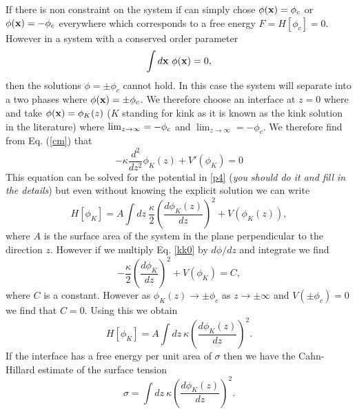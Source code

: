 If there is non constraint on the system if can simply chose $\phi({\bf x}) =\phi_c$ or $\phi({\bf x}) =-\phi_c$ everywhere which corresponds to a  free energy $F=H[\phi_c]=0$. However in a system with a conserved order parameter
\begin{equation}
    \int d{\bf x} \  \phi({\bf x})=0, 
\end{equation}
then the solutions $\phi=\pm \phi_c$ cannot hold. In this case the system will separate into a two phases where $\phi({\bf x})= \pm \phi_c$. We therefore choose an interface at $z=0$ where 
and take $\phi({\bf x}) = \phi_K(z)$ ($K$ standing for kink as it is known as the kink solution in the literature) where $\lim_{z\to\-\infty}=-\phi_c$ and  $\lim_{z\to\infty}=-\phi_c$. 
We therefore find from Eq. (\ref{cm}) that
\begin{equation}
    -\kappa \frac{d^2 }{dz^2}\phi_K(z)  + V'(\phi_K) = 0 \label{kk0}
\end{equation}
This equation can be solved for the potential in \eqref{p4} ({\em you should do it and fill in the details}) but even without knowing the explicit solution we can write
\begin{equation}
    H[\phi_K]=  A\int dz \ \frac{\kappa}{2}\left(\frac{d\phi_K(z)}{dz}\right)^2 + V(\phi_K(z)),\label{kk1}
\end{equation}
where $A$ is the surface area of the system in the plane perpendicular to the direction $z$. 
However if we multiply Eq. \eqref{kk0} by $d\phi/dz$ and integrate we find
\begin{equation}
    -\frac{\kappa}{2} (\frac{d\phi_K}{dz})^2 + V(\phi_K) = C,
\end{equation}
where $C$ is a constant. However as $\phi_K(z)\to \pm \phi_c$ as $z\to \pm \infty$ and $V(\pm\phi_c) =0$ we find that $C=0$. Using this we obtain 
\begin{equation}
    H[\phi_K]=  A\int dz\  {\kappa}\left(\frac{d\phi_K(z)}{dz}\right)^2 .
\end{equation}
If the interface has a free energy per unit area of $\sigma$ then we have the Cahn-Hillard estimate of the surface tension 
\begin{equation}
    \sigma=  \int dz\  {\kappa}\left(\frac{d\phi_K(z)}{dz}\right)^2 .\label{CHST}
\end{equation}


